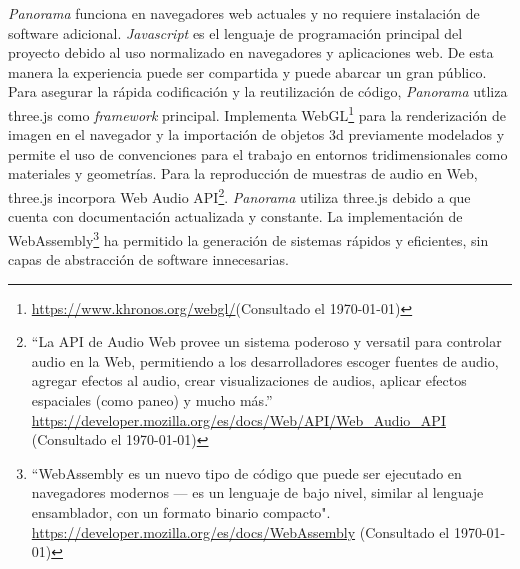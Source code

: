 \textit{Panorama} funciona en navegadores web actuales y no requiere instalación de software adicional. \textit{Javascript} es el lenguaje de programación principal del proyecto debido al uso normalizado en navegadores y aplicaciones web. De esta manera la experiencia puede ser compartida y puede abarcar un gran público. Para asegurar la rápida codificación y la reutilización de código, \textit{Panorama} utliza three.js como \textit{framework} principal. Implementa WebGL\footnote{\url{https://www.khronos.org/webgl/}(Consultado el \today)} para la renderización de imagen en el navegador y la importación de objetos 3d previamente modelados y permite el uso de convenciones para el trabajo en entornos tridimensionales como materiales y geometrías. Para la reproducción de muestras de audio en Web, three.js incorpora Web Audio API\footnote{``La API de Audio Web provee un sistema poderoso y versatil para controlar audio en la Web, permitiendo a los desarrolladores escoger fuentes de audio, agregar efectos al audio, crear visualizaciones de audios, aplicar efectos espaciales (como paneo) y mucho más.'' \url{https://developer.mozilla.org/es/docs/Web/API/Web_Audio_API} (Consultado el \today)}. \textit{Panorama} utiliza three.js debido a que cuenta con documentación actualizada y constante. La implementación de WebAssembly\footnote{``WebAssembly es un nuevo tipo de código que puede ser ejecutado en navegadores modernos — es un lenguaje de bajo nivel, similar al lenguaje ensamblador, con un formato binario compacto". \url{https://developer.mozilla.org/es/docs/WebAssembly} (Consultado el \today) } ha permitido la generación de sistemas rápidos y eficientes, sin capas de abstracción de software innecesarias. %

\color{BlueViolet}
  
